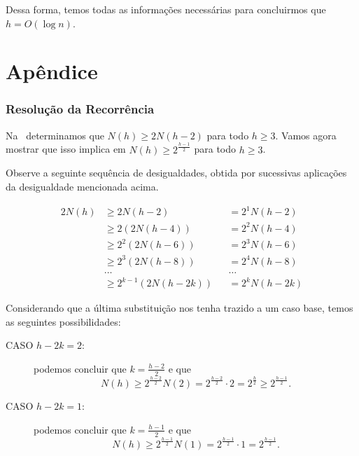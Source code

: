 \documentclass[10pt,a4paper,twoside]{article}
\theoremstyle{definition}
\begin{document}
     Dessa forma, temos todas as informações necessárias para concluirmos que \( h = O(\log n) \).

  \part*{Apêndice}

    \section{Resolução da Recorrência}

     Na~ determinamos que \( N(h) \geq 2N(h-2) \) para todo \( h \geq 3 \). Vamos agora mostrar que isso implica em \( N(h) \geq 2^{\frac{h-1}{2}} \) para todo \( h \geq 3 \).

     Observe a seguinte sequência de desigualdades, obtida por sucessivas aplicações da desigualdade mencionada acima.

     \begin{alignat*}{2}
       N(h) & \geq 2N(h-2)           &  & = 2^1 N(h-2)  \\
            & \geq 2(2N(h-4))        &  & = 2^2 N(h-4)  \\
            & \geq 2^2(2N(h-6))      &  & = 2^3 N(h-6)  \\
            & \geq 2^3(2N(h-8))      &  & = 2^4 N(h-8)  \\
            & \dots                  &  & \dots         \\
            & \geq 2^{k-1}(2N(h-2k)) &  & = 2^k N(h-2k)
     \end{alignat*}

     Considerando que a última substituição nos tenha trazido a um caso base, temos as seguintes possibilidades:

     \begin{description}
       \item[CASO \( h-2k = 2 \):] podemos concluir que \( k = \frac{h-2}{2} \) e que \[ N(h) \geq 2^{\frac{h-2}{2}} N(2) = 2^{\frac{h-2}{2}} \cdot 2 = 2^{\frac{h}{2}} \geq 2^{\frac{h-1}{2}}. \]
       \item[CASO \( h-2k = 1 \):] podemos concluir que \( k = \frac{h-1}{2} \) e que \[ N(h) \geq 2^{\frac{h-1}{2}} N(1) = 2^{\frac{h-1}{2}} \cdot 1 = 2^{\frac{h-1}{2}}. \]
     \end{description}

     \printbibliography
\end{document}

